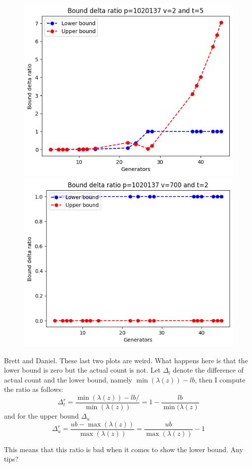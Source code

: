\documentclass{article}
\begin{document}
\begin{figure}[H]
\begin{minipage}{.49\textwidth}
    \end{minipage}
    \begin{minipage}{.49\textwidth}
            \centering
            \includegraphics[width=\textwidth]{../plots/tuples_figures/explosion_example_2.2.png}
            \includegraphics[width=\textwidth]{../plots/tuples_figures/explosion_example_4.2.png}
    \end{minipage}
\end{figure}

Brett and Daniel. These last two plots are weird. What happens here is that the lower bound is zero but the actual count is not. Let $\Delta_l$ denote the difference of actual count and the lower bound, namely $\min(\lambda(z)) - lb$, then I compute the ratio as follows:
$$ \Delta_l^r = \frac{\min(\lambda(z)) - lb/}{\min(\lambda(z))} = 1 - \frac{lb}{\min(\lambda(z)}$$ 
and for the upper bound $\Delta_u$
$$ \Delta_u^r = \frac{ub - \max(\lambda(z))}{\max(\lambda(z))} = \frac{ub}{\max(\lambda(z))} - 1 $$

This means that this ratio is bad when it comes to show the lower bound. Any tips?
\end{document}
